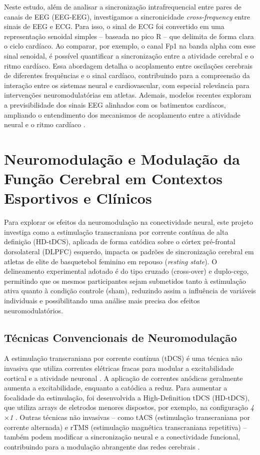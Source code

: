 Neste estudo, além de analisar a sincronização intrafrequencial entre pares de canais de EEG (EEG-EEG), investigamos a sincronicidade \textit{cross-frequency} entre sinais de EEG e ECG. Para isso, o sinal de ECG foi convertido em uma representação senoidal simples – baseada no pico R – que delimita de forma clara o ciclo cardíaco. Ao comparar, por exemplo, o canal Fp1 na banda alpha com esse sinal senoidal, é possível quantificar a sincronização entre a atividade cerebral e o ritmo cardíaco. Essa abordagem detalha o acoplamento entre oscilações cerebrais de diferentes frequências e o sinal cardíaco, contribuindo para a compreensão da interação entre os sistemas neural e cardiovascular, com especial relevância para intervenções neuromodulatórias em atletas. Ademais, modelos recentes exploram a previsibilidade dos sinais EEG alinhados com os batimentos cardíacos, ampliando o entendimento dos mecanismos de acoplamento entre a atividade neural e o ritmo cardíaco \cite{vergara2024exploring}.

\section{Neuromodulação e Modulação da Função Cerebral em Contextos Esportivos e Clínicos}
Para explorar os efeitos da neuromodulação na conectividade neural, este projeto investiga como a estimulação transcraniana por corrente contínua de alta definição (HD-tDCS), aplicada de forma catódica sobre o córtex pré-frontal dorsolateral (DLPFC) esquerdo, impacta os padrões de sincronização cerebral em atletas de elite de basquetebol feminino em repouso (\textit{resting state}). O delineamento experimental adotado é do tipo cruzado (cross-over) e duplo-cego, permitindo que os mesmos participantes sejam submetidos tanto à estimulação ativa quanto à condição controle (sham), reduzindo assim a influência de variáveis individuais e possibilitando uma análise mais precisa dos efeitos neuromodulatórios.

\subsection{Técnicas Convencionais de Neuromodulação}
A estimulação transcraniana por corrente contínua (tDCS) é uma técnica não invasiva que utiliza correntes elétricas fracas para modular a excitabilidade cortical e a atividade neuronal \cite{nitsche2000excitability, okano2013estimulacao, stagg2011physiological, purpura1965intracellular}. A aplicação de correntes anódicas geralmente aumenta a excitabilidade, enquanto a catódica a reduz. Para aumentar a focalidade da estimulação, foi desenvolvida a High-Definition tDCS (HD-tDCS), que utiliza arrays de eletrodos menores dispostos, por exemplo, na configuração \emph{4$\times$1} \cite{villamar2013hdtdcs}. Outras técnicas não invasivas – como tACS (estimulação transcraniana por corrente alternada) e rTMS (estimulação magnética transcraniana repetitiva) – também podem modificar a sincronização neural e a conectividade funcional, contribuindo para a modulação abrangente das redes cerebrais \cite{scheler2019neuromodulation, kunze2014high}.

